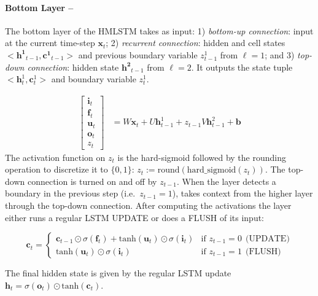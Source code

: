 \paragraph{Bottom Layer --}

The bottom layer of the HMLSTM takes as input: 1) \emph{bottom-up connection}: input  at  the current time-step $\mathbf{x}_t$; 2) \emph{recurrent connection}: hidden and cell states $<\mathbf{h^1}_{t-1}, \mathbf{c^1}_{t-1}>$  and previous
boundary variable $z^1_{t-1}$ from $\ell=1$; and 3) \emph{top-down connection}: hidden state $\mathbf{h^2}_{t-1}$ from $\ell=2$. It outputs the state tuple $<\mathbf{h}^1_{t}, \mathbf{c}^1_{t}>$ and boundary variable $z^1_t$.

\begin{align}
     \begin{bmatrix}
           \mathbf{i}_{t} \\
           \mathbf{f}_{t} \\
           \mathbf{u}_{t} \\
           \mathbf{o}_t \\
           z_t
         \end{bmatrix} &= W \mathbf{x}_t + U\mathbf{h}^1_{t-1} + z_{t-1} V\mathbf{h}^{2}_{t-1} +  \mathbf{b} 
\end{align}
The activation function on $z_t$ is the hard-sigmoid followed by
the rounding operation to discretize it to $\{0, 1\}$: 
$z_t := \mathrm{round}(\mathrm{hard\_sigmoid}(z_t))$.
The top-down connection is turned on and off by $z_{t-1}$.
When the layer detects a boundary in the previous step (i.e.\ $z_{t-1}=1$), takes context from the higher layer through the top-down connection.
  After computing the activations the layer either runs a regular LSTM UPDATE or does a FLUSH of its input:

\begin{equation}
    \mathbf{c}_t = \begin{cases}  
            \mathbf{c}_{t-1} \odot \sigma (\mathbf{f}_t) + \text{tanh}(\mathbf{u}_t) \odot 
            \sigma (\mathbf{i}_t) & \mbox{if } z_{t-1} = 0  \: \: \text{(UPDATE)}\\
            \text{tanh}(\mathbf{u}_t) \odot \sigma (\mathbf{i}_t)  & \mbox{if }  z_{t-1} = 1  \: \: \text{(FLUSH)}
            \end{cases}
\end{equation}

\noindent
The final hidden state is given by the regular LSTM update
    $\mathbf{h}_t = \sigma (\mathbf{o}_t) \odot \text{tanh}(\mathbf{c}_t)$.

